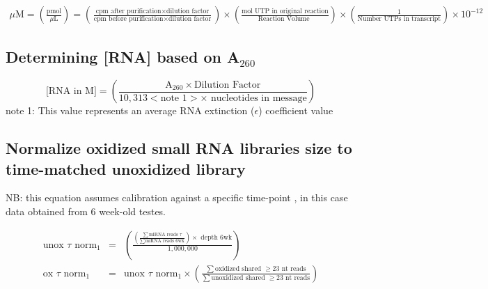 {\tiny{
\begin{eqnarray*}
\mu \mbox{M} = \left( \frac{\mbox{pmol}}{\mu\mbox{L}}\right)
      = \left( \frac{\mbox{cpm after purification} \times \mbox{dilution factor}}{\mbox{cpm before purification} \times \mbox{dilution factor}} \right)
      \times \left( \frac{\mbox{mol UTP in original reaction}}{\mbox{Reaction Volume }} \right) \times \left( \frac{1}{\mbox{Number UTPs in transcript}} \right) \times 10^{-12} 
\end{eqnarray*}
}
}


\subsection{Determining [RNA] based on A$_{260}$}


$$
\mbox{[RNA in M]} = \left( \frac{\mbox{A}_{260} \times \mbox{Dilution Factor}}
                           {10,313 < \mbox{note 1}> \times \mbox{ nucleotides in message}} \right) 
$$
note 1: This value represents an average RNA extinction ($\epsilon$) coefficient value \\

\subsection{Normalize oxidized small RNA libraries size to time-matched unoxidized library}

NB: this equation assumes calibration against a specific time-point ,
in this case data obtained from 6 week-old testes.

\begin{eqnarray*}
     \mbox{unox }\tau \mbox{ norm}_1 & = & \left(         
                        \frac{\left( \frac{\displaystyle\sum \mbox{miRNA reads } \tau}{\displaystyle \sum \mbox{miRNA reads 6wk} } \right) \times \mbox{ depth 6wk} }{1,000,000}              
                                          \right)\\
\mbox{ox }\tau \mbox{ norm}_1 & = &   \mbox{unox }\tau \mbox{ norm}_1 \times
                                 \left(
                                  \frac{\displaystyle \sum \mbox{oxidized shared } \ge \mbox{23 nt reads}}{\displaystyle \sum \mbox{unoxidized shared } \ge \mbox{23 nt reads}}
                                 \right)                                         
\end{eqnarray*}

